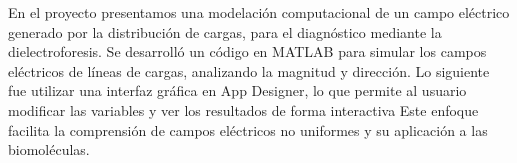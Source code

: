 
En el proyecto presentamos una modelación computacional de un campo eléctrico generado por la distribución de cargas, para el diagnóstico mediante la dielectroforesis. Se desarrolló un código en MATLAB para simular los campos eléctricos de líneas de cargas, analizando la magnitud y dirección. Lo siguiente fue utilizar una interfaz gráfica en App Designer, lo que permite al usuario modificar las variables y ver los resultados de forma interactiva Este enfoque facilita la comprensión de campos eléctricos no uniformes y su aplicación a las biomoléculas.
